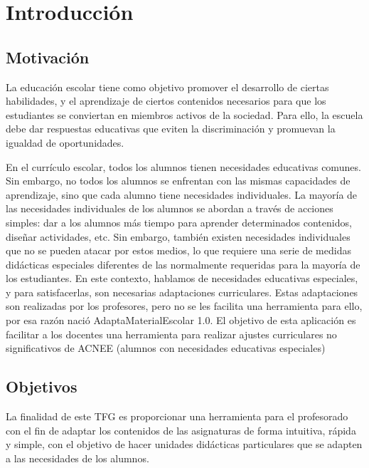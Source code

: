 \chapter{Introducción}
\label{cap:introduccion}


\section{Motivación}
La educación escolar tiene como objetivo promover el desarrollo de ciertas habilidades, y el aprendizaje de ciertos contenidos necesarios para que los estudiantes se conviertan en miembros activos de la sociedad. Para ello, la escuela debe dar respuestas educativas que eviten la discriminación y promuevan la igualdad de oportunidades.

En el currículo escolar, todos los alumnos tienen necesidades educativas comunes. Sin embargo, no todos los alumnos se enfrentan con las mismas capacidades de aprendizaje, sino que cada alumno tiene necesidades individuales. La mayoría de las necesidades individuales de los alumnos se abordan a través de acciones simples: dar a los alumnos más tiempo para aprender determinados contenidos, diseñar actividades, etc.  Sin embargo, también existen necesidades individuales que no se pueden atacar por estos medios, lo que requiere una serie de medidas didácticas especiales diferentes de las normalmente requeridas para la mayoría de los estudiantes. En este contexto, hablamos de necesidades educativas especiales, y para satisfacerlas, son necesarias adaptaciones curriculares.  Estas adaptaciones son realizadas por los profesores, pero no se les facilita una herramienta para ello, por esa razón nació AdaptaMaterialEscolar 1.0. El objetivo de esta aplicación es facilitar a los docentes una herramienta para realizar ajustes curriculares no significativos de ACNEE (alumnos con necesidades educativas especiales)

\section{Objetivos}
La finalidad de este TFG es proporcionar una herramienta para el profesorado con el fin de adaptar los contenidos de las asignaturas de forma intuitiva, rápida y simple, con el objetivo de hacer unidades didácticas particulares que se adapten a las necesidades de los alumnos.

